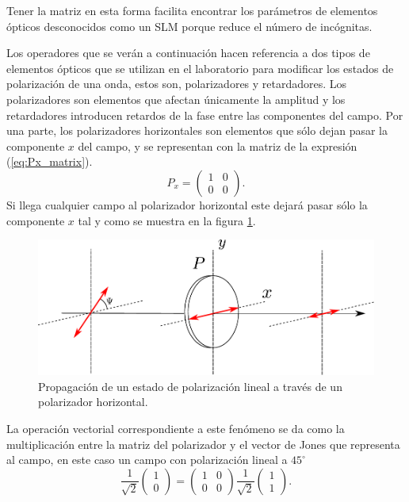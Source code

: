 \begin{enumerate}
Tener la matriz en esta forma facilita encontrar los parámetros de elementos
ópticos desconocidos como un SLM porque reduce el número de incógnitas.

\end{enumerate}

Los operadores que se verán a
continuación hacen referencia a dos tipos de elementos ópticos que se
utilizan en el laboratorio para modificar los estados de polarización
de una onda, estos son, polarizadores y retardadores. Los polarizadores
son elementos que afectan únicamente la amplitud y los
retardadores introducen retardos de la fase entre las componentes del campo.
Por una parte, los polarizadores horizontales son elementos que sólo
dejan pasar la componente $x$ del campo, y se representan con la
matriz de la expresión (\ref{eq:Px_matrix}).
\begin{equation}
P_x = \begin{pmatrix}1 &0\\0&0\end{pmatrix}.
\label{eq:Px_matrix}
\end{equation}
Si llega cualquier campo al polarizador horizontal este dejará pasar
sólo la componente $x$ tal y
como se muestra en la figura \ref{fig:linear_polarizer}. 
\begin{figure}[h!]
\centering
\includegraphics[scale = .7]{linear_polarizer}
\caption{Propagación de un estado de polarización lineal a través de
  un polarizador horizontal.}
\label{fig:linear_polarizer}
\end{figure}
La  operación vectorial correspondiente a este fenómeno se da como la
multiplicación entre la matriz del polarizador y el vector de Jones
que representa al campo, en este caso un campo con polarización lineal
a $45^{\circ}$
\begin{equation*}
\frac{1}{\sqrt{2}}
\begin{pmatrix}
1\\0
\end{pmatrix}
=
\begin{pmatrix}
1 &0\\0&0
\end{pmatrix}
\frac{1}{\sqrt{2}}
\begin{pmatrix}
1 \\1
\end{pmatrix}.
\end{equation*}
